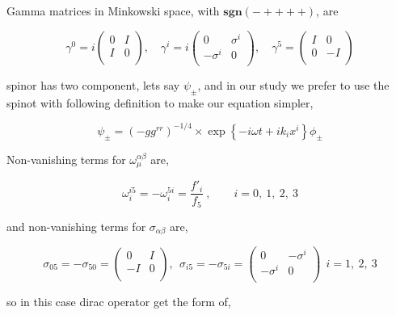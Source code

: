 Gamma matrices in Minkowski space, with $\mathbf{sgn}(-++++)$, are

\begin{equation}
   \gamma^0 =i\begin{pmatrix} 0 & I \\ I & 0 \\ \end{pmatrix}, \quad
   \gamma^i =i\begin{pmatrix} 0 & \sigma^i \\ -\sigma^i & 0 \\ \end{pmatrix}, \quad
   \gamma^5 = \begin{pmatrix} I & 0 \\ 0 & -I \\ \end{pmatrix}
\end{equation}

spinor has two component, lets say $\psi_{\pm}$, and in our study we prefer to use the spinot with following definition to make our equation simpler,

\begin{equation} \label{eq:spinorVectorOriginal}
    \psi_{\pm} = (-gg^{rr})^{-1/4}\times\exp\left\{-i\omega t +ik_ix^i\right\}\phi_{\pm}
\end{equation}

Non-vanishing terms for $\omega^{\alpha\beta}_{\mu}$ are,

\begin{equation}
   \omega^{i5}_i = -\omega^{5i}_i = \frac{f'_i}{f_5} ~, \qquad i=0,~1,~2,~3 
\end{equation}

and non-vanishing terms for $\sigma_{\alpha\beta}$ are,

\begin{equation}
   \sigma_{05} = -\sigma_{50} = \begin{pmatrix} 0 & I \\ -I & 0 \\ \end{pmatrix}, ~~ \sigma_{i5} = -\sigma_{5i} = \begin{pmatrix} 0 & -\sigma^i \\ -\sigma^i & 0 \\ \end{pmatrix}~~ i=1,~2,~3
\end{equation}

so in this case dirac operator get the form of,

